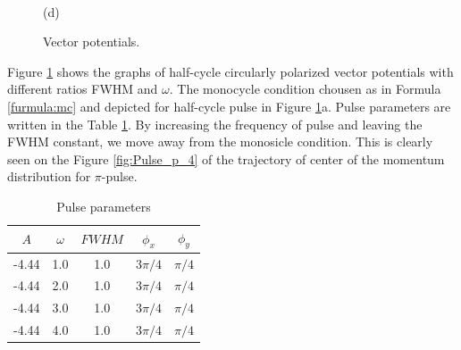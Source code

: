 \begin{figure}[h!]
\begin{minipage}[h]{0.5\linewidth}
\end{minipage}
\hfill
\begin{minipage}[h]{0.5\linewidth}
 \\(d)
\end{minipage}
\caption{Vector potentials.}
\label{fig:Pulses_4}
\end{figure}

Figure \ref{fig:Pulses_4} shows the graphs of half-cycle circularly polarized vector potentials with different ratios FWHM and $\omega$. The monocycle condition chousen as in Formula \ref{furmula:mc} and depicted for half-cycle pulse in Figure \ref{fig:Pulses_4}a. Pulse parameters are written in the Table \ref{table:4}. By increasing the frequency of pulse and leaving the FWHM constant, we move away from the monosicle condition. This is clearly seen on the Figure \ref{fig:Pulse_p_4} of the trajectory of center of the momentum distribution for $\pi$-pulse.

\begin{table}[h!]
\begin{center}
  \begin{tabular}{ | c | c | c | c | c |}
    \hline
    $A$ & $\omega$ & $FWHM$ & $\phi_x$ & $\phi_y$ \\ \hline
    -4.44 & 1.0 & 1.0 & $3\pi /4$ & $\pi /4$  \\ \hline
    -4.44 & 2.0 & 1.0 & $3\pi /4$ & $\pi /4$   \\ \hline
    -4.44 & 3.0 & 1.0 & $3\pi /4$ & $\pi /4$   \\ \hline
    -4.44 & 4.0 & 1.0 & $3\pi /4$ & $\pi /4$   \\    
    \hline
  \end{tabular}
\caption{Pulse parameters}
\label{table:4}
\end{center}
\end{table}


